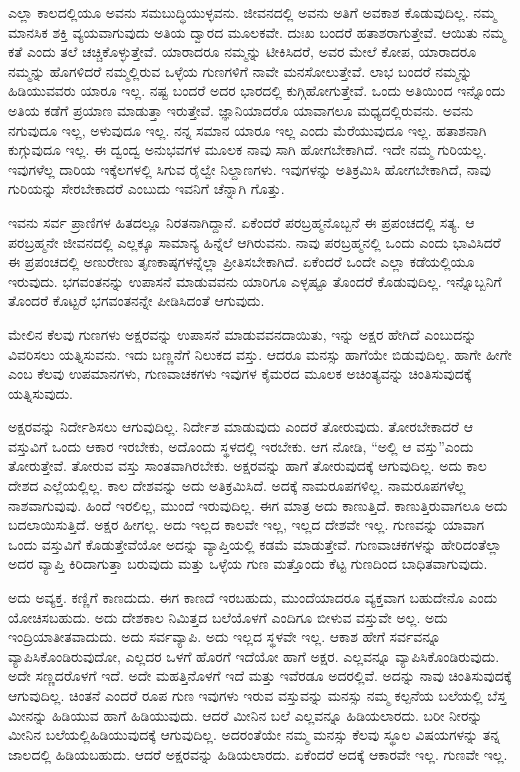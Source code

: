 ಎಲ್ಲಾ ಕಾಲದಲ್ಲಿಯೂ ಅವನು ಸಮಬುದ್ಧಿಯುಳ್ಳವನು. ಜೀವನದಲ್ಲಿ ಅವನು ಅತಿಗೆ ಅವಕಾಶ ಕೊಡುವುದಿಲ್ಲ. ನಮ್ಮ ಮಾನಸಿಕ ಶಕ್ತಿ ವ್ಯಯವಾಗುವುದು ಅತಿಯ ದ್ವಾರದ ಮೂಲಕವೇ. ದುಃಖ ಬಂದರೆ ಹತಾಶರಾಗುತ್ತೇವೆ. ಆಯಿತು ನಮ್ಮ ಕತೆ ಎಂದು ತಲೆ ಚಚ್ಚಿಕೊಳ್ಳುತ್ತೇವೆ. ಯಾರಾ\-ದರೂ ನಮ್ಮನ್ನು ಟೀಕಿಸಿದರೆ, ಅವರ ಮೇಲೆ ಕೋಪ, ಯಾರಾದರೂ ನಮ್ಮನ್ನು ಹೊಗಳಿದರೆ ನಮ್ಮಲ್ಲಿರುವ ಒಳ್ಳೆಯ ಗುಣಗಳಿಗೆ ನಾವೇ ಮನಸೋಲುತ್ತೇವೆ. ಲಾಭ ಬಂದರೆ ನಮ್ಮನ್ನು ಹಿಡಿಯುವವರು ಯಾರೂ ಇಲ್ಲ. ನಷ್ಟ ಬಂದರೆ ಅದರ ಭಾರದಲ್ಲಿ ಕುಗ್ಗಿಹೋಗುತ್ತೇವೆ. ಒಂದು ಅತಿಯಿಂದ ಇನ್ನೊಂದು ಅತಿಯ ಕಡೆಗೆ ಪ್ರಯಾಣ ಮಾಡುತ್ತಾ ಇರುತ್ತೇವೆ. ಜ್ಞಾನಿಯಾದರೊ ಯಾವಾಗಲೂ ಮಧ್ಯದಲ್ಲಿರುವನು. ಅವನು ನಗುವುದೂ ಇಲ್ಲ, ಅಳುವುದೂ ಇಲ್ಲ. ನನ್ನ ಸಮಾನ ಯಾರೂ ಇಲ್ಲ ಎಂದು ಮೆರೆಯುವುದೂ ಇಲ್ಲ. ಹತಾಶನಾಗಿ ಕುಗ್ಗುವುದೂ ಇಲ್ಲ. ಈ ದ್ವಂದ್ವ ಅನುಭವಗಳ ಮೂಲಕ ನಾವು ಸಾಗಿ ಹೋಗಬೇಕಾಗಿದೆ. ಇದೇ ನಮ್ಮ ಗುರಿಯಲ್ಲ. ಇವುಗಳೆಲ್ಲ ದಾರಿಯ ಇಕ್ಕೆಲಗಳಲ್ಲಿ ಸಿಗುವ ರೈಲ್ವೇ ನಿಲ್ದಾಣಗಳು. ಇವುಗಳನ್ನು ಅತಿಕ್ರಮಿಸಿ ಹೋಗಬೇಕಾಗಿದೆ, ನಾವು ಗುರಿಯನ್ನು ಸೇರಬೇಕಾದರೆ ಎಂಬುದು ಇವನಿಗೆ ಚೆನ್ನಾಗಿ ಗೊತ್ತು.

ಇವನು ಸರ್ವ ಪ್ರಾಣಿಗಳ ಹಿತದಲ್ಲೂ ನಿರತನಾಗಿದ್ದಾನೆ. ಏಕೆಂದರೆ ಪರಬ್ರಹ್ಮನೊಬ್ಬನೆ ಈ ಪ್ರಪಂಚದಲ್ಲಿ ಸತ್ಯ. ಆ ಪರಬ್ರಹ್ಮನೇ ಜೀವನದಲ್ಲಿ ಎಲ್ಲಕ್ಕೂ ಸಾಮಾನ್ಯ ಹಿನ್ನೆಲೆ ಆಗಿರುವನು. ನಾವು ಪರಬ್ರಹ್ಮನಲ್ಲಿ ಒಂದು ಎಂದು ಭಾವಿಸಿದರೆ ಈ ಪ್ರಪಂಚದಲ್ಲಿ ಅಣುರೇಣು ತೃಣಕಾಷ್ಠಗಳ\-ನ್ನೆಲ್ಲಾ ಪ್ರೀತಿಸಬೇಕಾಗಿದೆ. ಏಕೆಂದರೆ ಒಂದೇ ಎಲ್ಲಾ ಕಡೆಯಲ್ಲಿಯೂ ಇರುವುದು. ಭಗವಂತನನ್ನು ಉಪಾಸನೆ ಮಾಡುವವನು ಯಾರಿಗೂ ಎಳ್ಳಷ್ಟೂ ತೊಂದರೆ ಕೊಡುವುದಿಲ್ಲ. ಇನ್ನೊಬ್ಬನಿಗೆ ತೊಂದರೆ ಕೊಟ್ಟರೆ ಭಗವಂತನನ್ನೇ ಪೀಡಿಸಿದಂತೆ ಆಗುವುದು.

ಮೇಲಿನ ಕೆಲವು ಗುಣಗಳು ಅಕ್ಷರವನ್ನು ಉಪಾಸನೆ ಮಾಡುವವನದಾಯಿತು, ಇನ್ನು ಅಕ್ಷರ ಹೇಗಿದೆ ಎಂಬುದನ್ನು ವಿವರಿಸಲು ಯತ್ನಿಸುವನು. ಇದು ಬಣ್ಣನೆಗೆ ನಿಲುಕದ ವಸ್ತು. ಆದರೂ ಮನಸ್ಸು ಹಾಗೆಯೇ ಬಿಡುವುದಿಲ್ಲ. ಹಾಗೇ ಹೀಗೇ ಎಂಬ ಕೆಲವು ಉಪಮಾನಗಳು, ಗುಣವಾಚಕಗಳು ಇವುಗಳ ಕೈಮರದ ಮೂಲಕ ಅಚಿಂತ್ಯವನ್ನು ಚಿಂತಿಸುವುದಕ್ಕೆ ಯತ್ನಿಸುವುದು.

ಅಕ್ಷರವನ್ನು ನಿರ್ದೇಶಿಸಲು ಆಗುವುದಿಲ್ಲ. ನಿರ್ದೇಶ ಮಾಡುವುದು ಎಂದರೆ ತೋರುವುದು. ತೋರಬೇಕಾದರೆ ಆ ವಸ್ತುವಿಗೆ ಒಂದು ಆಕಾರ ಇರಬೇಕು, ಅದೊಂದು ಸ್ಥಳದಲ್ಲಿ ಇರಬೇಕು. ಆಗ ನೋಡಿ, “ಅಲ್ಲಿ ಆ ವಸ್ತು”ಎಂದು ತೋರುತ್ತೇವೆ. ತೋರುವ ವಸ್ತು ಸಾಂತವಾಗಿರಬೇಕು. ಅಕ್ಷರವನ್ನು ಹಾಗೆ ತೋರುವುದಕ್ಕೆ ಆಗುವುದಿಲ್ಲ. ಅದು ಕಾಲ ದೇಶದ ಎಲ್ಲೆಯಲ್ಲಿಲ್ಲ. ಕಾಲ ದೇಶವನ್ನು ಅದು ಅತಿಕ್ರಮಿಸಿದೆ. ಅದಕ್ಕೆ ನಾಮರೂಪಗಳಿಲ್ಲ. ನಾಮರೂಪಗಳೆಲ್ಲ ನಾಶವಾಗುವುವು. ಹಿಂದೆ ಇರಲಿಲ್ಲ, ಮುಂದೆ ಇರುವುದಿಲ್ಲ. ಈಗ ಮಾತ್ರ ಅದು ಕಾಣುತ್ತಿದೆ. ಕಾಣುತ್ತಿರುವಾಗಲೂ ಅದು ಬದಲಾಯಿಸುತ್ತಿದೆ. ಅಕ್ಷರ ಹೀಗಲ್ಲ. ಅದು ಇಲ್ಲದ ಕಾಲವೇ ಇಲ್ಲ, ಇಲ್ಲದ ದೇಶವೇ ಇಲ್ಲ. ಗುಣವನ್ನು ಯಾವಾಗ ಒಂದು ವಸ್ತುವಿಗೆ ಕೊಡುತ್ತೇವೆಯೋ ಅದನ್ನು ವ್ಯಾಪ್ತಿಯಲ್ಲಿ ಕಡಮೆ ಮಾಡುತ್ತೇವೆ. ಗುಣವಾಚಕಗಳನ್ನು ಹೇರಿದಂತೆಲ್ಲಾ ಅದರ ವ್ಯಾಪ್ತಿ ಕಿರಿದಾಗುತ್ತಾ ಬರುವುದು ಮತ್ತು ಒಳ್ಳೆಯ ಗುಣ ಮತ್ತೊಂದು ಕೆಟ್ಟ ಗುಣದಿಂದ ಬಾಧಿತವಾಗುವುದು.

ಅದು ಅವ್ಯಕ್ತ. ಕಣ್ಣಿಗೆ ಕಾಣದುದು. ಈಗ ಕಾಣದೆ ಇರಬಹುದು, ಮುಂದೆಯಾದರೂ ವ್ಯಕ್ತವಾಗ ಬಹುದೇನೊ ಎಂದು ಯೋಚಿಸಬಹುದು. ಅದು ದೇಶಕಾಲ ನಿಮಿತ್ತದ ಬಲೆಯೊಳಗೆ ಎಂದಿಗೂ ಬೀಳುವ ವಸ್ತುವೇ ಅಲ್ಲ. ಅದು ಇಂದ್ರಿಯಾತೀತವಾದುದು. ಅದು ಸರ್ವವ್ಯಾಪಿ. ಅದು ಇಲ್ಲದ ಸ್ಥಳವೇ ಇಲ್ಲ. ಆಕಾಶ ಹೇಗೆ ಸರ್ವವನ್ನೂ ವ್ಯಾಪಿಸಿಕೊಂಡಿರುವುದೋ, ಎಲ್ಲದರ ಒಳಗೆ ಹೊರಗೆ ಇದೆಯೋ ಹಾಗೆ ಅಕ್ಷರ. ಎಲ್ಲವನ್ನೂ ವ್ಯಾಪಿಸಿಕೊಂಡಿರುವುದು. ಅದೇ ಸಣ್ಣದರೊಳಗೆ ಇದೆ. ಅದೇ ಮಹತ್ತಿನೊಳಗೆ ಇದೆ ಮತ್ತು ಇವೆರಡೂ ಅದರಲ್ಲಿವೆ. ಅದನ್ನು ನಾವು ಚಿಂತಿಸುವುದಕ್ಕೆ ಆಗುವುದಿಲ್ಲ. ಚಿಂತನೆ ಎಂದರೆ ರೂಪ ಗುಣ ಇವುಗಳು ಇರುವ ವಸ್ತುವನ್ನು ಮನಸ್ಸು ನಮ್ಮ ಕಲ್ಪನೆಯ ಬಲೆಯಲ್ಲಿ ಬೆಸ್ತ ಮೀನನ್ನು ಹಿಡಿಯುವ ಹಾಗೆ ಹಿಡಿಯುವುದು. ಆದರೆ ಮೀನಿನ ಬಲೆ ಎಲ್ಲವನ್ನೂ ಹಿಡಿಯಲಾರದು. ಬರೀ ನೀರನ್ನು ಮೀನಿನ ಬಲೆಯಲ್ಲಿ\break ಹಿಡಿಯುವುದಕ್ಕೆ ಆಗುವುದಿಲ್ಲ. ಅದರಂತೆಯೇ ನಮ್ಮ ಮನಸ್ಸು ಕೆಲವು ಸ್ಥೂಲ ವಿಷಯಗಳನ್ನು ತನ್ನ ಜಾಲದಲ್ಲಿ ಹಿಡಿಯಬಹುದು. ಆದರೆ ಅಕ್ಷರವನ್ನು ಹಿಡಿಯಲಾರದು. ಏಕೆಂದರೆ ಅದಕ್ಕೆ ಆಕಾರವೇ ಇಲ್ಲ. ಗುಣವೇ ಇಲ್ಲ.

